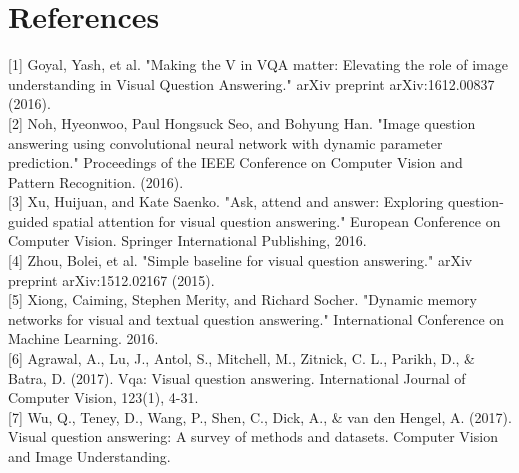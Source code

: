\documentclass{article}
\begin{document}
\section*{References}

[1] Goyal, Yash, et al. "Making the V in VQA matter: Elevating the role of image understanding in Visual Question Answering." arXiv preprint arXiv:1612.00837 (2016).\\

[2] Noh, Hyeonwoo, Paul Hongsuck Seo, and Bohyung Han. "Image question answering using convolutional neural network with dynamic parameter prediction." Proceedings of the IEEE Conference on Computer Vision and Pattern Recognition. (2016).\\

[3] Xu, Huijuan, and Kate Saenko. "Ask, attend and answer: Exploring question-guided spatial attention for visual question answering." European Conference on Computer Vision. Springer International Publishing, 2016.\\

[4] Zhou, Bolei, et al. "Simple baseline for visual question answering." arXiv preprint arXiv:1512.02167 (2015).\\

[5] Xiong, Caiming, Stephen Merity, and Richard Socher. "Dynamic memory networks for visual and textual question answering." International Conference on Machine Learning. 2016.\\

[6] Agrawal, A., Lu, J., Antol, S., Mitchell, M., Zitnick, C. L., Parikh, D., \& Batra, D. (2017). Vqa: Visual question answering. International Journal of Computer Vision, 123(1), 4-31.\\ 

[7] Wu, Q., Teney, D., Wang, P., Shen, C., Dick, A., \& van den Hengel, A. (2017). Visual question answering: A survey of methods and datasets. Computer Vision and Image Understanding.\\ 
\end{document}
